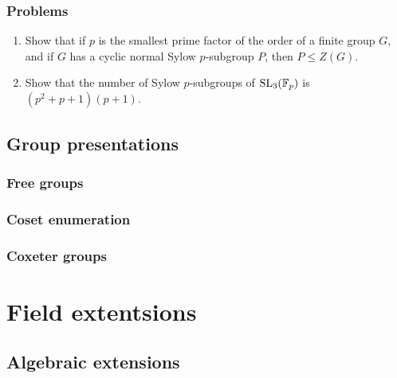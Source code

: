 \documentclass{../../large}
\begin{document}
\section*{Problems}
\begin{enumerate}
\item Show that if $p$ is the smallest prime factor of the order of a finite group $G$, and if $G$ has a cyclic normal Sylow $p$-subgroup $P$, then $P\le Z(G)$.
\item Show that the number of Sylow $p$-subgroups of $\mathrm{SL}_3(\mathbb{F}_p)$ is $(p^2+p+1)(p+1)$.
\end{enumerate}











\chapter{Group presentations}

\section{Free groups}

\section{Coset enumeration}
\begin{prb}
\end{prb}
\begin{prb}
\end{prb}
\begin{prb}
\end{prb}

\section{Coxeter groups}









\part{Field extentsions}

\chapter{Algebraic extensions}
\end{document}
